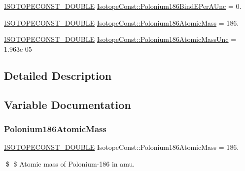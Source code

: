 \begin{DoxyCompactItemize}
\mbox{\hyperlink{group___isotope_const-_macros_ga8f45a7272ce02c0b4c65c44636ed719a}{I\+S\+O\+T\+O\+P\+E\+C\+O\+N\+S\+T\+\_\+\+D\+O\+U\+B\+LE}} \mbox{\hyperlink{group___isotope_const-_polonium-_po186_ga8c20267aeb39f5eb4d8e0422eba7050c}{Isotope\+Const\+::\+Polonium186\+Bind\+E\+Per\+A\+Unc}} = 0.
\item 
\mbox{\hyperlink{group___isotope_const-_macros_ga8f45a7272ce02c0b4c65c44636ed719a}{I\+S\+O\+T\+O\+P\+E\+C\+O\+N\+S\+T\+\_\+\+D\+O\+U\+B\+LE}} \mbox{\hyperlink{group___isotope_const-_polonium-_po186_gab25e41f7484551f52ff37eb6bddf2bd1}{Isotope\+Const\+::\+Polonium186\+Atomic\+Mass}} = 186.
\item 
\mbox{\hyperlink{group___isotope_const-_macros_ga8f45a7272ce02c0b4c65c44636ed719a}{I\+S\+O\+T\+O\+P\+E\+C\+O\+N\+S\+T\+\_\+\+D\+O\+U\+B\+LE}} \mbox{\hyperlink{group___isotope_const-_polonium-_po186_ga726ebb396e97f9febf9abfdb86da5ff5}{Isotope\+Const\+::\+Polonium186\+Atomic\+Mass\+Unc}} = 1.\+963e-\/05
\end{DoxyCompactItemize}


\subsection{Detailed Description}


\subsection{Variable Documentation}
\mbox{\label{group___isotope_const-_polonium-_po186_gab25e41f7484551f52ff37eb6bddf2bd1}} 
\subsubsection{\texorpdfstring{Polonium186\+Atomic\+Mass}{Polonium186AtomicMass}}
{\footnotesize\ttfamily \mbox{\hyperlink{group___isotope_const-_macros_ga8f45a7272ce02c0b4c65c44636ed719a}{I\+S\+O\+T\+O\+P\+E\+C\+O\+N\+S\+T\+\_\+\+D\+O\+U\+B\+LE}} Isotope\+Const\+::\+Polonium186\+Atomic\+Mass = 186.}

\$ \$ Atomic mass of Polonium-\/186 in amu. \mbox{\label{group___isotope_const-_polonium-_po186_ga726ebb396e97f9febf9abfdb86da5ff5}} 
